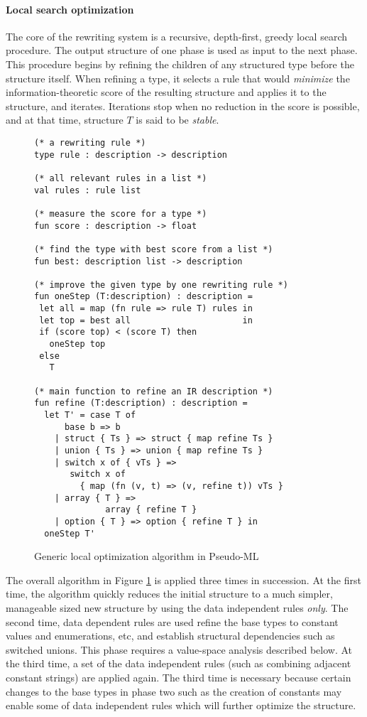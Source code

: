 \paragraph*{Local search optimization}
The core of the rewriting system is 
a recursive, depth-first, greedy local search procedure. The output 
structure of one phase is used as input to the next phase.
This procedure begins by refining the children of any structured type before
the structure itself. When refining a type, it selects a rule that 
would {\em minimize} the information-theoretic score of the resulting
structure and applies it to the structure, and iterates.
Iterations stop when no reduction in the score is possible, and at
that time, structure $T$ is said to be {\em stable}.

\begin{figure}
{\small 
\begin{verbatim}
(* a rewriting rule *)
type rule : description -> description  

(* all relevant rules in a list *)
val rules : rule list 

(* measure the score for a type *)
fun score : description -> float

(* find the type with best score from a list *)
fun best: description list -> description

(* improve the given type by one rewriting rule *)
fun oneStep (T:description) : description =
 let all = map (fn rule => rule T) rules in
 let top = best all                      in
 if (score top) < (score T) then
   oneStep top
 else
   T

(* main function to refine an IR description *) 
fun refine (T:description) : description =
  let T' = case T of
      base b => b
    | struct { Ts } => struct { map refine Ts }
    | union { Ts } => union { map refine Ts }
    | switch x of { vTs } => 
       switch x of 
         { map (fn (v, t) => (v, refine t)) vTs }
    | array { T } => 
              array { refine T }
    | option { T } => option { refine T } in
  oneStep T'
\end{verbatim}
}
\caption{Generic local optimization algorithm in Pseudo-ML}
\label{fig:refinement}
\end{figure}

The overall algorithm in Figure \ref{fig:refinement} is applied three
times in succession. 
At the first time, the algorithm quickly reduces the initial structure to 
a much simpler, manageable sized new structure by using
the data independent rules {\em only}. The second time, data dependent
rules are used refine the base types to constant values and enumerations, etc,
and establish structural dependencies such as switched unions. This phase
requires a value-space analysis described below.
At the third time, a set of the data independent rules
(such as combining adjacent constant strings) are applied again. 
The third time is necessary because certain changes
to the base types in phase two such as the creation of constants may 
enable some of data independent rules which will further optimize the structure. 

